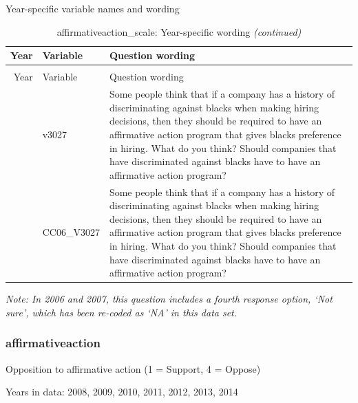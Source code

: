 \documentclass[
  12pt]{article}
\begin{document}
Year-specific variable names and
wording\begingroup\fontsize{11}{13}\selectfont

\begin{longtable}[t]{rl>{\raggedright\arraybackslash}p{10cm}}
\caption{\label{tab:unnamed-chunk-5}affirmativeaction\_scale: Year-specific wording}\\
\toprule
Year & Variable & Question wording\\
\midrule
\endfirsthead
\caption[]{affirmativeaction\_scale: Year-specific wording \textit{(continued)}}\\
\toprule
Year & Variable & Question wording\\
\midrule
\endhead

\endfoot
\bottomrule
\endlastfoot
2006 & v3027 & Some people think that if a company has a history of discriminating against blacks when making hiring decisions, then they should be required to have an affirmative action program that gives blacks preference in hiring.    What do you think? Should companies that have discriminated against blacks have to have an affirmative action program?\\
\addlinespace
2007 & CC06\_V3027 & Some people think that if a company has a history of discriminating against blacks when making hiring decisions, then they should be required to have an affirmative action program that gives blacks preference in hiring. What do you think? Should companies that have discriminated against blacks have to have an affirmative action program?\\*
\end{longtable}
\endgroup{}

\emph{Note: In 2006 and 2007, this question includes a fourth response
option, `Not sure', which has been re-coded as `NA' in this data set.}

\hypertarget{affirmativeaction}{%
\subsubsection{affirmativeaction}\label{affirmativeaction}}

Opposition to affirmative action (1 = Support, 4 = Oppose)

Years in data: 2008, 2009, 2010, 2011, 2012, 2013,
2014\begingroup\fontsize{10}{12}\selectfont
\end{document}
